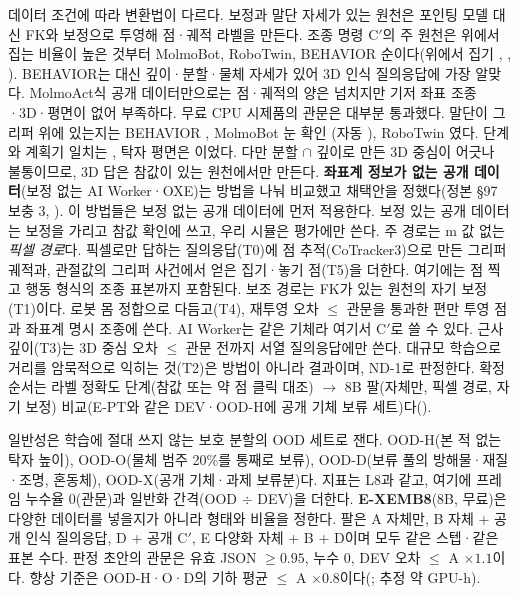 데이터 조건에 따라 변환법이 다르다. 보정과 말단 자세가 있는 원천은 포인팅 모델 대신 FK와 보정으로 투영해 점·궤적 라벨을 만든다. 조종 명령 C$'$의 주 원천은 위에서 집는 비율이 높은 것부터 MolmoBot, RoboTwin, BEHAVIOR 순이다(위에서 집기 , , ). BEHAVIOR는 대신 깊이·분할·물체 자세가 있어 3D 인식 질의응답에 가장 알맞다. MolmoAct식 공개 데이터만으로는 점·궤적의 양은 넘치지만 기저 좌표 조종·3D·평면이 없어 부족하다. 무료 CPU 시제품의 관문은 대부분 통과했다. 말단이 그리퍼 위에 있는지는 BEHAVIOR , MolmoBot 눈 확인 (자동 ), RoboTwin 였다. 단계와 계획기 일치는 , 탁자 평면은 이었다. 다만 분할 $\cap$ 깊이로 만든 3D 중심이  어긋나 불통이므로, 3D 답은 참값이 있는 원천에서만 만든다. \textbf{좌표계 정보가 없는 공개 데이터}(보정 없는 AI Worker·OXE)는 방법을 나눠 비교했고 채택안을 정했다(정본 §97 보충 3, ). 이 방법들은 보정 없는 공개 데이터에 먼저 적용한다. 보정 있는 공개 데이터는 보정을 가리고 참값 확인에 쓰고, 우리 시뮬은 평가에만 쓴다. 주 경로는 m 값 없는 \emph{픽셀 경로}다. 픽셀로만 답하는 질의응답(T0)에 점 추적(CoTracker3)으로 만든 그리퍼 궤적과, 관절값의 그리퍼 사건에서 얻은 집기·놓기 점(T5)을 더한다. 여기에는 점 찍고 행동 형식의 조종 표본까지 포함된다. 보조 경로는 FK가 있는 원천의 자기 보정(T1)이다. 로봇 몸 정합으로 다듬고(T4), 재투영 오차 $\le$  관문을 통과한 편만 투영 점과 좌표계 명시 조종에 쓴다. AI Worker는 같은 기체라 여기서 C$'$로 쓸 수 있다. 근사 깊이(T3)는 3D 중심 오차 $\le$  관문 전까지 서열 질의응답에만 쓴다. 대규모 학습으로 거리를 암묵적으로 익히는 것(T2)은 방법이 아니라 결과이며, ND-1로 판정한다. 확정 순서는 라벨 정확도 단계(참값 또는 약 점 클릭 대조) $\rightarrow$ 8B 팔(자체만, 픽셀 경로, 자기 보정) 비교(E-PT와 같은 DEV·OOD-H에 공개 기체 보류 세트)다().

일반성은 학습에 절대 쓰지 않는 보호 분할의 OOD 세트로 잰다. OOD-H(본 적 없는 탁자 높이), OOD-O(물체 범주 20\%를 통째로 보류), OOD-D(보류 풀의 방해물·재질·조명, 혼동체), OOD-X(공개 기체·과제 보류분)다. 지표는 L8과 같고, 여기에 프레임 누수율 0(관문)과 일반화 간격(OOD $\div$ DEV)을 더한다. \textbf{E-XEMB8}(8B, 무료)은 다양한 데이터를 넣을지가 아니라 형태와 비율을 정한다. 팔은 A 자체만, B 자체 + 공개 인식 질의응답, D + 공개 C$'$, E 다양화 자체 + B + D이며 모두 같은 스텝·같은 표본 수다. 판정 초안의 관문은 유효 JSON $\ge0.95$, 누수 0, DEV 오차 $\le$ A $\times1.1$이다. 향상 기준은 OOD-H·O·D의 기하 평균 $\le$ A $\times0.8$이다(; 추정 약  GPU-h).
